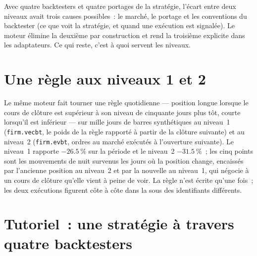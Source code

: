 \begin{remark}\label{rem:pl:backtest-engine-architecture:settled}
Avec quatre backtesters et quatre portages de la stratégie, l'écart entre deux niveaux avait trois causes possibles~: le marché, le portage et les
conventions du backtester (ce que voit la stratégie, et quand une exécution est signalée). Le moteur élimine la deuxième par construction et rend la
troisième explicite dans les adaptateurs. Ce qui reste, c'est à quoi servent les niveaux.
\end{remark}

\section{Une règle aux niveaux 1 et 2}

Le même moteur fait tourner une règle quotidienne --- position longue lorsque le cours de clôture est supérieur à son niveau de cinquante jours plus tôt, courte lorsqu'il est inférieur --- sur mille jours de
barres synthétiques au niveau~1 (\texttt{firm.vecbt}, le poids de la règle rapporté à partir de la clôture suivante) et au niveau~2 (\texttt{firm.evbt}, ordres au marché
exécutés à l'ouverture suivante). Le niveau~1 rapporte $-26.5~\%$ sur la période et le niveau~2 $-31.5~\%$~; les cinq points sont les mouvements de nuit
survenus les jours où la position change, encaissés par l'ancienne position au niveau~2 et par la nouvelle au niveau~1, qui négocie à un cours de clôture
qu'elle vient à peine de voir. La règle n'est écrite qu'une fois~; les deux exécutions figurent côte à côte dans la  sous des identifiants différents.

\section{Tutoriel~: une stratégie à travers quatre backtesters}\label{tut:pl:backtest-engine-architecture:tut}

